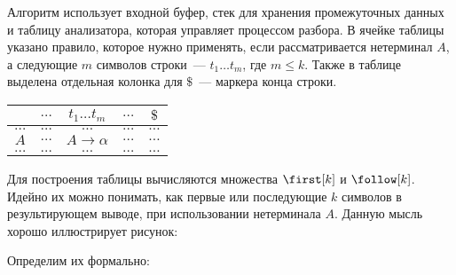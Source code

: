 Алгоритм использует входной буфер, стек для хранения промежуточных данных и таблицу анализатора, которая управляет процессом разбора. 
В ячейке таблицы указано правило, которое нужно применять, если рассматривается нетерминал $A$, а следующие $m$ символов строки~--- $t_{1} \dots t_{m}$, где $m \leq k$. 
Также в таблице выделена отдельная колонка для $\$$~--- маркера конца строки. 

\begin{center}
  \begin{tabular}{ c || c | c | c | c }
             & $\dots$ & $t_{1} \dots t_{m}$ & $\dots$ & $\$$ \\ \hline  
    $\dots$  & $\dots$ & $\dots$ & $\dots$ & $\dots$ \\ \hline  
    $A$  & $\dots$ & $A \to \alpha$ & $\dots$ & $\dots$ \\ \hline  
    $\dots$  & $\dots$ & $\dots$ & $\dots$ & $\dots$ 
  \end{tabular}  
\end{center}

Для построения таблицы вычисляются множества $\first[k]$ и $\follow[k]$. Идейно их можно понимать, как первые или последующие $k$ символов в результирующем выводе, при использовании нетерминала $A$. Данную мысль хорошо иллюстрирует рисунок:

\begin{center}
\end{center}

Определим их формально:

